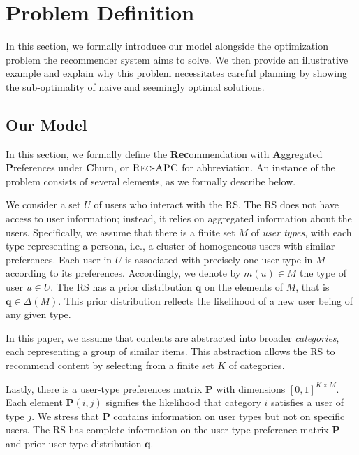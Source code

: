 \section{Problem Definition}
\label{sec:problem-definition}

In this section, we formally introduce our model alongside the optimization problem the recommender system aims to solve. We then provide an illustrative example and explain why this problem necessitates careful planning by showing the sub-optimality of naive and seemingly optimal solutions.

\subsection{Our Model}
In this section, we formally define the \textbf{Rec}ommendation with \textbf{A}ggregated \textbf{P}references under \textbf{C}hurn, or $\textsc{Rec-APC}$ for abbreviation. An instance of the problem consists of several elements, as we formally describe below.

We consider a set $U$ of users who interact with the RS.
The RS does not have access to user information; instead, it relies on aggregated information about the users. Specifically, we assume that there is a finite set $M$ of \emph{user types}, with each type representing a persona, i.e., a cluster of homogeneous users with similar preferences. Each user in $U$ is associated with precisely one user type in $M$ according to its preferences. Accordingly, we denote by $m(u)\in M$ the type of user $u\in U$. The RS has a prior distribution $\bm{q}$ on the elements of $M$, that is $\bm{q} \in \Delta(M)$. This prior distribution reflects the likelihood of a new user being of any given type. %

In this paper, we assume that contents are abstracted into broader \emph{categories}, each representing a group of similar items. This abstraction allows the RS to recommend content by selecting from a finite set $K$ of categories.

Lastly, there is a user-type preferences matrix $\bm{P}$ with dimensions $[0,1]^{K \times M}$. Each element $\bm{P}(i,j)$ signifies the likelihood that category $i$ satisfies a user of type $j$. We stress that $\bm{P}$ contains information on user types but not on specific users. The RS has complete information on the user-type preference matrix $\bm P$ and prior user-type distribution $\bm q$.

